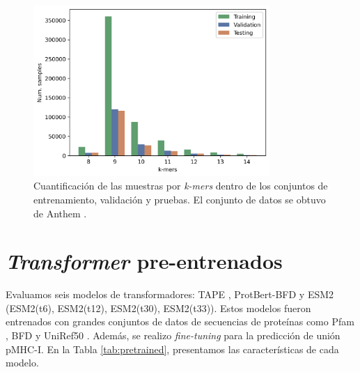 \begin{figure}[]
	\centering\includegraphics[width=0.8\textwidth]{img/proposal/dataset_samples}
	\caption{
		Cuantificación de las muestras por \textit{k-mers} dentro de los conjuntos de entrenamiento, validación y pruebas. El conjunto de datos se obtuvo de Anthem \cite{mei2021anthem}.}
	\label{fig:samples}
\end{figure}


\section{\textit{Transformer} pre-entrenados}

Evaluamos seis modelos de transformadores: TAPE \citep{rao2019evaluating}, ProtBert-BFD \citep{elnaggar2021prottrans} y ESM2 \citep{lin2023evolutionary} (ESM2(t6), ESM2(t12), ESM2(t30), ESM2(t33)). Estos modelos fueron entrenados con grandes conjuntos de datos de secuencias de proteínas como Pfam \citep{el2019pfam},  BFD y UniRef50 \citep{suzek2015uniref}. Además, se realizo \textit{fine-tuning } para la predicción de unión pMHC-I. En la Tabla \ref{tab:pretrained}, presentamos las características de cada modelo.

